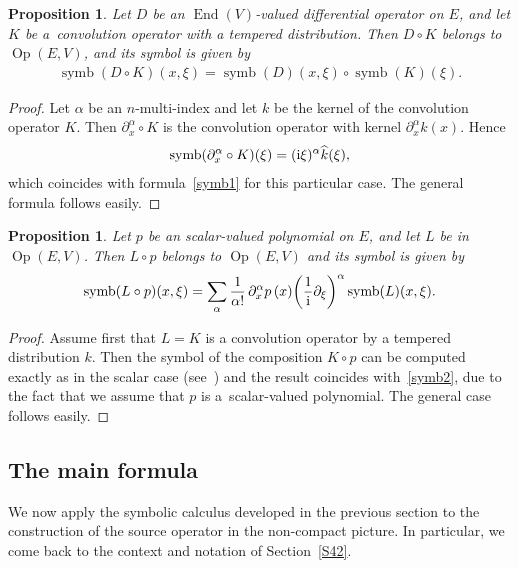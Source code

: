 \documentclass[10pt,a4paper]{amsart}
\DeclareMathOperator{\End}{End}
\DeclareMathOperator{\Op}{Op}
\DeclareMathOperator{\symb}{symb}
\numberwithin{equation}{section}
\newtheorem{prop}[theor]{Proposition}
\begin{document}
\begin{prop} %
 Let $D$ be an $\End(V)$-valued differential operator on $E$, and let $K$ be a~convolution operator with a tempered distribution. Then $D\circ K$ belongs to $\Op(E, V)$, and its symbol is given by
\begin{gather}\label{symb1}
 \symb(D\circ K)(x,\xi) = \symb(D) (x,\xi) \circ \symb(K)(\xi) .
\end{gather}
\end{prop}
\begin{proof} Let $\alpha$ be an $n$-multi-index and let $k$ be the kernel of the convolution operator $K$. Then
$\partial_x^\alpha \circ K$ is the convolution operator with kernel $\partial_x^\alpha k(x)$. Hence
\begin{gather*}
\symb(\partial_x^\alpha \circ K) (\xi) = ({\rm i}\xi)^\alpha \widehat k(\xi) ,
\end{gather*}
which coincides with formula~\eqref{symb1} for this particular case. The general formula follows easily.
\end{proof}

\begin{prop} %
 Let $p$ be an scalar-valued polynomial on $E$, and let $L$ be in $\Op(E,V)$. Then $L\circ p$ belongs to $\Op(E,V)$ and its symbol is given by
\begin{gather}\label{symb2}
\symb(L\circ p)(x,\xi) = \sum_\alpha\frac{1}{\alpha !}\, \partial_x^\alpha p\,(x) \bigg( \frac{1}{\rm i} \partial_\xi\bigg)^\alpha \symb(L)(x,\xi) .
\end{gather}
\end{prop}
\begin{proof} Assume first that $L=K$ is a convolution operator by a tempered distribution $k$. Then the symbol of the composition $K\circ p$ can be computed exactly as in the scalar case (see~\cite[Proposition~1.2]{c19}) and the result coincides with~\eqref{symb2}, due to the fact that we assume that $p$ is a~scalar-valued polynomial. The general case follows easily.
\end{proof}

\subsection{The main formula}\label{S44}

We now apply the symbolic calculus developed in the previous section to the construction of the source operator in the non-compact picture. In particular, we come back to the context and notation of Section~\ref{S42}.
\end{document}
